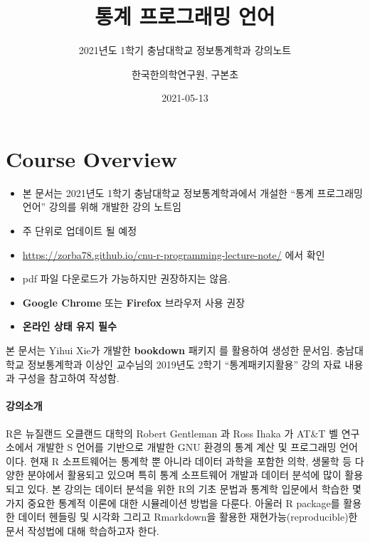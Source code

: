 \documentclass[
  11pt,
]{krantz}
\title{통계 프로그래밍 언어}
\subtitle{2021년도 1학기 충남대학교 정보통계학과 강의노트}
\author{한국한의학연구원, 구본초}
\date{2021-05-13}
\makeatletter
\providecommand{\tightlist}{%
  \setlength{\itemsep}{0pt}\setlength{\parskip}{0pt}}
\newenvironment{kframe}{%
\medskip{}
\setlength{\fboxsep}{.8em}
 \def\at@end@of@kframe{}%
 \ifinner\ifhmode%
  \def\at@end@of@kframe{\end{minipage}}%
  \begin{minipage}{\columnwidth}%
 \fi\fi%
 \def\FrameCommand##1{\hskip\@totalleftmargin \hskip-\fboxsep
 \colorbox{shadecolor}{##1}\hskip-\fboxsep
     \hskip-\linewidth \hskip-\@totalleftmargin \hskip\columnwidth}%
 \MakeFramed {\advance\hsize-\width
   \@totalleftmargin\z@ \linewidth\hsize
   \@setminipage}}%
 {\par\unskip\endMakeFramed%
 \at@end@of@kframe}
\newenvironment{rmdblock}[1]
  {
  \begin{itemize}
  \renewcommand{\labelitemi}{
    \raisebox{-.7\height}[0pt][0pt]{
      {\setkeys{Gin}{width=3em,keepaspectratio}\texttt{[image: images/\#1]}}
    }
  }
  \setlength{\fboxsep}{1em}
  \begin{kframe}
  \item
  }
  {
  \end{kframe}
  \end{itemize}
  }
\newenvironment{rmdnote}
  {\begin{rmdblock}{note}}
  {\end{rmdblock}}
\makeatother
\begin{document}
\maketitle

{
\hypersetup{linkcolor=}
\setcounter{tocdepth}{2}
\tableofcontents
}
\listoftables
\listoffigures
\hypertarget{overview}{%
\chapter*{Course Overview}\label{overview}}


\begin{rmdnote}
\begin{itemize}
\tightlist
\item
  본 문서는 2021년도 1학기 충남대학교 정보통계학과에서 개설한 ``통계 프로그래밍 언어'' 강의를 위해 개발한 강의 노트임
\item
  주 단위로 업데이트 될 예정
\item
  \url{https://zorba78.github.io/cnu-r-programming-lecture-note/} 에서 확인
\item
  pdf 파일 다운로드가 가능하지만 권장하지는 않음.
\item
  \textbf{Google Chrome} 또는 \textbf{Firefox} 브라우저 사용 권장
\item
  \textbf{온라인 상태 유지 필수}
\end{itemize}

본 문서는 Yihui Xie가 개발한 \textbf{bookdown} 패키지 \citep{xie-2016}를 활용하여 생성한 문서임. 충남대학교 정보통계학과 이상인 교수님의 2019년도 2학기 ``통계패키지활용''
강의 자료 내용과 구성을 참고하여 작성함.
\end{rmdnote}

\hypertarget{intro-lec}{%
\subsubsection*{강의소개}\label{intro-lec}}


R은 뉴질랜드 오클랜드 대학의 Robert Gentleman 과 Ross Ihaka 가 AT\&T 벨 연구소에서 개발한 S 언어를 기반으로 개발한 GNU 환경의 통계 계산 및 프로그래밍 언어이다. 현재 R 소프트웨어는 통계학 뿐 아니라 데이터 과학을 포함한 의학, 생물학 등 다양한 분야에서 활용되고 있으며 특히 통계 소프트웨어 개발과 데이터 분석에 많이 활용되고 있다. 본 강의는 데이터 분석을 위한 R의 기초 문법과 통계학 입문에서 학습한 몇 가지 중요한 통계적 이론에 대한 시뮬레이션 방법을 다룬다. 아울러 R package를 활용한 데이터 헨들링 및 시각화 그리고 Rmarkdown을 활용한 재현가능(reproducible)한 문서 작성법에 대해 학습하고자 한다.
\end{document}
